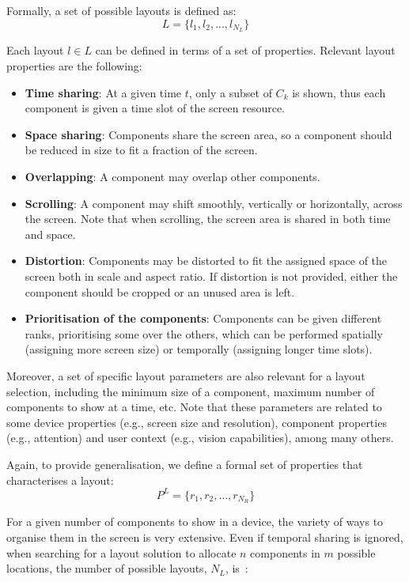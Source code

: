Formally, a set of possible layouts is defined as: 
\begin{equation}
L= \{  l_1, l_2, ..., l_{N_L} \}
\end{equation}

Each layout $l \in L$ can be defined in terms of a set of properties. 
Relevant layout properties are the following:

\begin{itemize}
	\item \textbf{Time sharing}: At a given time $t$, only a subset of $C_k$ is shown, thus each component is given a time slot of the screen resource.
	\item \textbf{Space sharing}: Components share the screen area, so a component should be reduced in size to fit a fraction of the screen.
	\item \textbf{Overlapping}: A component may overlap other components. 
	\item \textbf{Scrolling}: A component may shift smoothly, vertically or horizontally, across the screen. Note that when scrolling, the screen area is shared in both time and space. 
	\item \textbf{Distortion}: Components may be distorted to fit the assigned space of the screen both in scale and aspect ratio. If distortion is not provided, either the component should be cropped or an unused area is left.
	\item \textbf{Prioritisation of the components}: Components can be given different ranks, prioritising some over the others, which can be performed spatially (assigning more screen size) or temporally (assigning longer time slots). 
\end{itemize}

Moreover, a set of specific layout parameters are also relevant for a layout selection, including the minimum size of a component, maximum number of components to show at a time, etc. 
Note that these parameters are related to some device properties (e.g., screen size and resolution), component properties (e.g., attention) and user context (e.g., vision capabilities), among many others.

Again, to provide generalisation, we define a formal set of properties that characterises a layout: 
\begin{equation}
P^L = \{ r_1, r_2, ..., r_{N_R} \} 
\end{equation}

For a given number of components to show in a device, the variety of ways to organise them in the screen is very extensive. 
Even if temporal sharing is ignored, when searching for a layout solution to allocate $n$ components in $m$ possible locations, the number of possible layouts, $N_L$, is~\cite{sears1993layout}: 

